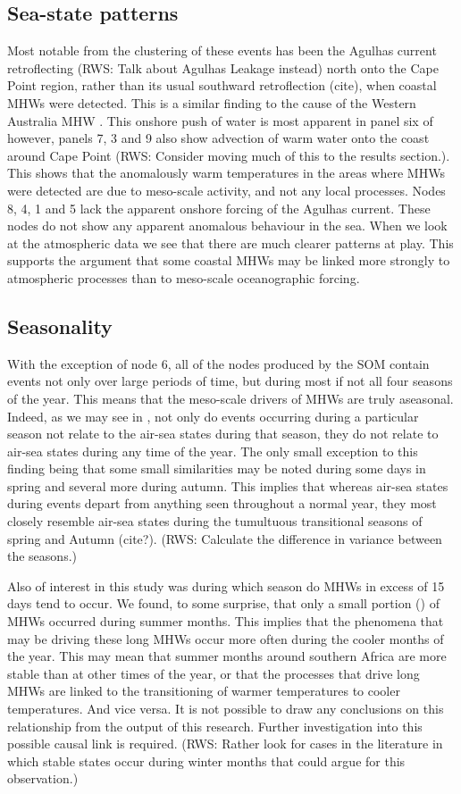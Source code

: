 \documentclass[a4paper,10pt,review]{elsarticle}
\begin{document}
\subsection{Sea-state patterns}
Most notable from the clustering of these events has been the Agulhas current retroflecting (RWS: Talk about Agulhas Leakage instead) north onto the Cape Point region, rather than its usual southward retroflection (cite), when coastal MHWs were detected. This is a similar finding to the cause of the Western Australia MHW \citep{Feng2013, Benthuysen2014}. This onshore push of water is most apparent in panel six of  however, panels 7, 3 and 9 also show advection of warm water onto the coast around Cape Point (RWS: Consider moving much of this to the results section.). This shows that the anomalously warm temperatures in the areas where MHWs were detected are due to meso-scale activity, and not any local processes. Nodes 8, 4, 1 and 5 lack the apparent onshore forcing of the Agulhas current. These nodes do not show any apparent anomalous behaviour in the sea. When we look at the atmospheric data we see that there are much clearer patterns at play. This supports the argument that some coastal MHWs may be linked more strongly to atmospheric processes than to meso-scale oceanographic forcing.

\subsection{Seasonality}
With the exception of node 6, all of the nodes produced by the SOM contain events not only over large periods of time, but during most if not all four seasons of the year. This means that the meso-scale drivers of MHWs are truly aseasonal. Indeed, as we may see in , not only do events occurring during a particular season not relate to the air-sea states during that season, they do not relate to air-sea states during any time of the year. The only small exception to this finding being that some small similarities may be noted during some days in spring and several more during autumn. This implies that whereas air-sea states during events depart from anything seen throughout a normal year, they most closely resemble air-sea states during the tumultuous transitional seasons of spring and Autumn (cite?). (RWS: Calculate the difference in variance between the seasons.)

Also of interest in this study was during which season do MHWs in excess of 15 days tend to occur. We found, to some surprise, that only a small portion () of MHWs occurred during summer months. This implies that the phenomena that may be driving these long MHWs occur more often during the cooler months of the year. This may mean that summer months around southern Africa are more stable than at other times of the year, or that the processes that drive long MHWs are linked to the transitioning of warmer temperatures to cooler temperatures. And vice versa. It is not possible to draw any conclusions on this relationship from the output of this research. Further investigation into this possible causal link is required. (RWS: Rather look for cases in the literature in which stable states occur during winter months that could argue for this observation.)
\end{document}
